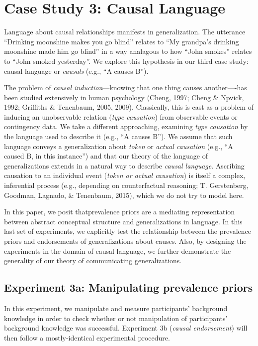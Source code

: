 \documentclass[english,floatsintext,man]{apa6}
\theoremstyle{definition}
\theoremstyle{definition}
\theoremstyle{definition}
\theoremstyle{remark}
\begin{document}
\section{Case Study 3: Causal
Language}\label{case-study-3-causal-language}

Language about causal relationships manifests in generalization. The
utterance \enquote{Drinking moonshine makes you go blind} relates to
\enquote{My grandpa's drinking moonshine made him go blind} in a way
analagous to how \enquote{John smokes} relates to \enquote{John smoked
yesterday}. We explore this hypothesis in our third case study: causal
language or \emph{causals} (e.g., \enquote{A causes B}).

The problem of \emph{causal induction}---knowing that one thing causes
another----has been studied extensively in human psychology (Cheng,
1997; Cheng \& Npvick, 1992; Griffiths \& Tenenbaum, 2005, 2009).
Classically, this is cast as a problem of inducing an unobservable
relation (\emph{type causation}) from observable events or contingency
data. We take a different approaching, examining \emph{type causation}
by the language used to describe it (e.g., \enquote{A causes B}). We
assume that such language conveys a generalization about \emph{token} or
\emph{actual causation} (e.g., \enquote{A caused B, in this instance})
and that our theory of the language of generalizations extends in a
natural way to describe \emph{causal language}. Ascribing causation to
an individual event (\emph{token or actual causation}) is itself a
complex, inferential process (e.g., depending on counterfactual
reasoning; T. Gerstenberg, Goodman, Lagnado, \& Tenenbaum, 2015), which
we do not try to model here.

In this paper, we posit thatprevalence priors are a mediating
representation between abstract conceptual structure and generalizations
in language. In this last set of experiments, we explicitly test the
relationship between the prevalence priors and endorsements of
generalizations about causes. Also, by designing the experiments in the
domain of causal language, we further demonstrate the generality of our
theory of communicating generalizations.

\subsection{Experiment 3a: Manipulating prevalence
priors}\label{experiment-3a-manipulating-prevalence-priors}

In this experiment, we manipulate and measure participants' background
knowledge in order to check whether or not manipulation of participants'
background knowledge was successful. Experiment 3b (\emph{causal
endorsement}) will then follow a mostly-identical experimental
procedure.
\end{document}
